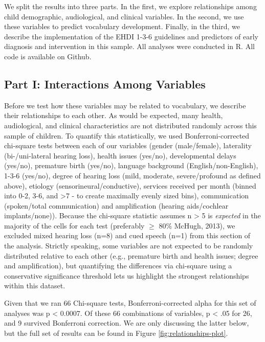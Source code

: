 \documentclass[english,man]{apa6}
\begin{document}
We split the results into three parts. In the first, we explore relationships among child demographic, audiological, and clinical variables. In the second, we use these variables to predict vocabulary development. Finally, in the third, we describe the implementation of the EHDI 1-3-6 guidelines and predictors of early diagnosis and intervention in this sample. All analyses were conducted in R. All code is available on Github.

\hypertarget{part-i-interactions-among-variables}{%
\subsection{Part I: Interactions Among Variables}\label{part-i-interactions-among-variables}}

Before we test how these variables may be related to vocabulary, we describe their relationships to each other. As would be expected, many health, audiological, and clinical characteristics are not distributed randomly across this sample of children. To quantify this statistically, we used Bonferroni-corrected chi-square tests between each of our variables (gender (male/female), laterality (bi-/uni-lateral hearing loss), health issues (yes/no), developmental delays (yes/no), premature birth (yes/no), language background (English/non-English), 1-3-6 (yes/no), degree of hearing loss (mild, moderate, severe/profound as defined above), etiology (sensorineural/conductive), services received per month (binned into 0-2, 3-6, and \textgreater{}7 - to create maximally evenly sized bins), communication (spoken/total communication) and amplification (hearing aids/cochlear implants/none)). Because the chi-square statistic assumes n \textgreater{} 5 is \emph{expected} in the majority of the cells for each test (preferably \(\geq\) 80\% McHugh, 2013), we excluded mixed hearing loss (n=8) and cued speech (n=1) from this section of the analysis. Strictly speaking, some variables are not expected to be randomly distributed relative to each other (e.g., premature birth and health issues; degree and amplification), but quantifying the differences via chi-square using a conservative significance threshold lets us highlight the strongest relationships within this dataset.

Given that we ran 66 Chi-square tests, Bonferroni-corrected alpha for this set of analyses was p \textless{} 0.0007. Of these 66 combinations of variables, p \textless{} .05 for 26, and 9 survived Bonferroni correction. We are only discussing the latter below, but the full set of results can be found in Figure \ref{fig:relationships-plot}.
\end{document}
